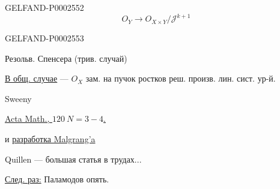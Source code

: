 \begin{GelfandAdjacentEvidence}{GELFAND-P000255}{2}
\begin{equation*}
O_Y\longrightarrow O_{X\times Y}/\mathcal J^{k+1}
\end{equation*}

\end{GelfandAdjacentEvidence}
\begin{GelfandAdjacentEvidence}{GELFAND-P000255}{3}


\end{GelfandAdjacentEvidence}


Резольв. Спенсера (трив. случай)





\underline{\underline{В общ. случае}} — $O_X$ зам. на пучок ростков реш. произв. лин. сист. ур-й.





Sweeny

\underline{Acta Math., $120\ N=3-4$.}

и \underline{разработка Malgrang'a}





Quillen — большая статья в трудах...

\underline{След. раз:} Паламодов опять.





\begin{flushright}
\end{flushright}







